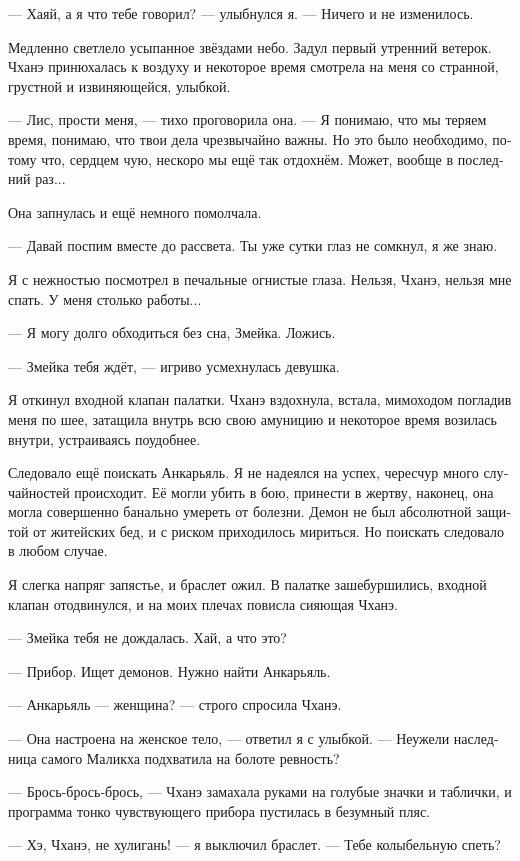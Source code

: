 \documentclass[a4paper,12pt,fleqn]{book}\usepackage{cooltooltips}\usepackage{polyglossia}\setdefaultlanguage[babelshorthands=true]{russian}\setotherlanguage{english}\defaultfontfeatures{Ligatures=TeX,Mapping=tex-text} \usepackage{xcolor}\definecolor{lightgray}{HTML}{bbbbbb}\color{lightgray}\newcommand{\ml}[3]{\textenglish{\textcolor{black}{#3}}}
\begin{document}
{--- Хаяй, а я что тебе говорил? --- улыбнулся я.
--- Ничего и не изменилось.

Медленно светлело усыпанное звёздами небо.
Задул первый утренний ветерок.
Чханэ принюхалась к воздуху и некоторое время смотрела на меня со странной, грустной и извиняющейся, улыбкой.

--- Лис, прости меня, --- тихо проговорила она.
--- Я понимаю, что мы теряем время, понимаю, что твои дела чрезвычайно важны.
Но это было необходимо, потому что, сердцем чую, нескоро мы ещё так отдохнём.
Может, вообще в последний раз...

Она запнулась и ещё немного помолчала.

--- Давай поспим вместе до рассвета.
Ты уже сутки глаз не сомкнул, я же знаю.

Я с нежностью посмотрел в печальные огнистые глаза.
Нельзя, Чханэ, нельзя мне спать.
У меня столько работы...

--- Я могу долго обходиться без сна, Змейка.
Ложись.

--- Змейка тебя ждёт, --- игриво усмехнулась девушка.

Я откинул входной клапан палатки.
Чханэ вздохнула, встала, мимоходом погладив меня по шее, затащила внутрь всю свою амуницию и некоторое время возилась внутри, устраиваясь поудобнее.

Следовало ещё поискать Анкарьяль.
Я не надеялся на успех, чересчур много случайностей происходит.
Её могли убить в бою, принести в жертву, наконец, она могла совершенно банально умереть от болезни.
Демон не был абсолютной защитой от житейских бед, и с риском приходилось мириться.
Но поискать следовало в любом случае.

Я слегка напряг запястье, и браслет ожил.
В палатке зашебуршились, входной клапан отодвинулся, и на моих плечах повисла сияющая Чханэ.

--- Змейка тебя не дождалась.
Хай, а что это?

--- Прибор.
Ищет демонов.
Нужно найти Анкарьяль.

--- Анкарьяль --- женщина? --- строго спросила Чханэ.

--- Она настроена на женское тело, --- ответил я с улыбкой.
--- Неужели наследница самого Маликха подхватила на болоте ревность?

--- Брось-брось-брось, --- Чханэ замахала руками на голубые значки и таблички, и программа тонко чувствующего прибора пустилась в безумный пляс.

--- Хэ, Чханэ, не хулигань! --- я выключил браслет.
--- Тебе колыбельную спеть?

}
\end{document}
